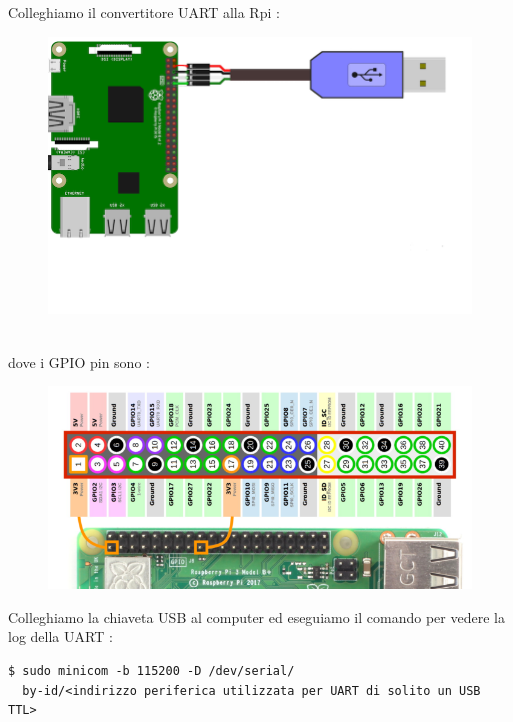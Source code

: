 \documentclass[12pt, a4paper]{article}
\begin{document}
\begin{flushleft}
Colleghiamo il convertitore UART alla Rpi :
\begin{figure}[h!]
\includegraphics[width=\linewidth]{rpi-uart-usb.png}
\end{figure}
\\
dove i GPIO pin sono :
\begin{figure}[h!]
\includegraphics[width=\linewidth]{rpi-gpio.png}
\end{figure}

\newpage
Colleghiamo la chiaveta USB al computer ed eseguiamo il comando per vedere la log della UART :
\begin{lstlisting}[style=BashStyle] 
$ sudo minicom -b 115200 -D /dev/serial/
  by-id/<indirizzo periferica utilizzata per UART di solito un USB TTL>
\end{lstlisting}


\end{flushleft}
\end{document}
